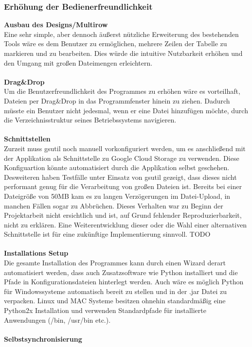 \documentclass[13pt,a4paper,bibliography=totocnumbered,listof=totocnumbered]{scrartcl}
\begin{document}
\subsubsection{Erhöhung der Bedienerfreundlichkeit}
\textbf{Ausbau des Designs/Multirow}\\
Eine sehr simple, aber dennoch äußerst nützliche Erweiterung des bestehenden Tools wäre es dem Benutzer zu ermöglichen, mehrere Zeilen der Tabelle zu markieren und zu bearbeiten. Dies würde die intuitive Nutzbarkeit erhöhen und den Umgang mit großen Dateimengen erleichtern. \\
\\\textbf{Drag\&Drop}\\
Um die Benutzerfreundlichkeit des Programmes zu erhöhen wäre es vorteilhaft, Dateien per Drag\&Drop in das Programmfenster hinein zu ziehen. Dadurch müsste ein Benutzer nicht jedesmal, wenn er eine Datei hinzufügen möchte, durch die Verzeichnisstruktur seines Betriebssystems navigieren.\\
\\\textbf{Schnittstellen}\\
Zurzeit muss gsutil noch manuell vorkonfiguriert werden, um es anschließend mit der Applikation als Schnittstelle zu Google Cloud Storage zu verwenden. Diese Konfiguartion könnte automatisiert durch die Applikation selbst geschehen. Desweiteren haben Testfälle unter Einsatz von gsutil gezeigt, dass dieses nicht performant genug für die Verarbeitung von großen Dateien ist. Bereits bei einer Dateigröße von 50MB kam es zu langen Verzögerungen im Datei-Upload, in manchen Fällen sogar zu Abbrüchen. Dieses Verhalten war zu Beginn der Projektarbeit nicht ersichtlich und ist, auf Grund fehlender Reproduzierbarkeit, nicht zu erklären. Eine Weiterentwicklung dieser oder die Wahl einer alternativen Schnittstelle ist für eine zukünftige Implementierung sinnvoll. TODO\\
\\\textbf{Installations Setup}\\
Die gesamte Installation des Programmes kann durch einen Wizard derart automatisiert werden, dass auch Zusatzsoftware wie Python installiert und die Pfade in Konfigurationsdateien hinterlegt werden. Auch wäre es möglich Python für Windowssysteme automatisch bereit zu stellen und in der .jar Datei zu verpacken. Linux und MAC Systeme besitzen ohnehin standardmäßig eine Python2x Installation und verwenden Standardpfade für installierte Anwendungen (/bin, /usr/bin etc.).\\
\\\textbf{Selbstsynchronisierung}\\
\end{document}
